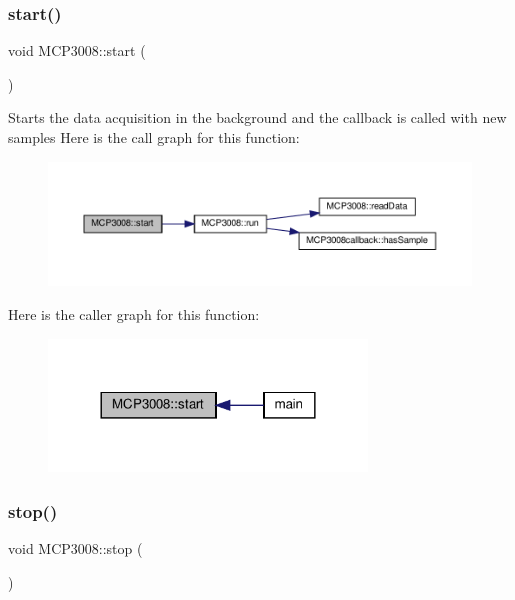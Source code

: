 \subsubsection{\texorpdfstring{start()}{start()}}
{\footnotesize\ttfamily void M\+C\+P3008\+::start (\begin{DoxyParamCaption}{ }\end{DoxyParamCaption})}

Starts the data acquisition in the background and the callback is called with new samples Here is the call graph for this function\+:
\nopagebreak
\begin{figure}[H]
\begin{center}
\leavevmode
\includegraphics[width=350pt]{classMCP3008_a839bea8d430ee0852620c151c4467450_cgraph}
\end{center}
\end{figure}
Here is the caller graph for this function\+:
\nopagebreak
\begin{figure}[H]
\begin{center}
\leavevmode
\includegraphics[width=240pt]{classMCP3008_a839bea8d430ee0852620c151c4467450_icgraph}
\end{center}
\end{figure}
\mbox{\label{classMCP3008_add8fa4dafb68c227cd1ed269bd30603f}} 
\subsubsection{\texorpdfstring{stop()}{stop()}}
{\footnotesize\ttfamily void M\+C\+P3008\+::stop (\begin{DoxyParamCaption}{ }\end{DoxyParamCaption})}

